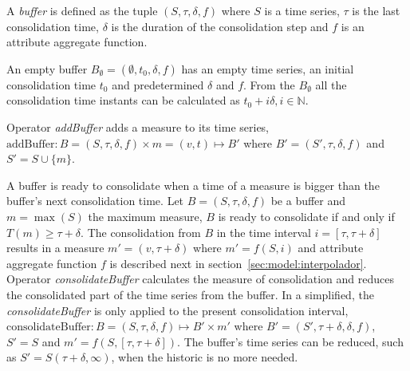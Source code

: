 \begin{definition}[Buffer]
  A \emph{buffer} is defined as the tuple $(S,\tau,\delta,f)$ where
  $S$ is a time series, $\tau$ is the last consolidation time, $\delta$
  is the duration of the consolidation step and $f$ is an
  attribute aggregate function. 

  An empty buffer $B_{\emptyset} = (\emptyset,t_0, \delta, f)$ has an
  empty time series, an initial consolidation time $t_0$ and
  predetermined $\delta$ and $f$. From the $B_{\emptyset}$ all the
  consolidation time instants can be calculated as $t_0+i\delta,
  i\in\mathbb{N}$.
\end{definition}


Operator \emph{addBuffer} adds a 
measure to its time series, $\text{addBuffer}: B =
(S,\tau,\delta,f) \times m = (v,t) \mapsto B'$ where
$B'=(S',\tau,\delta,f)$ and $S' = S \cup \{m\} $.



A buffer is ready to consolidate when a time of a measure is
bigger than the buffer's next consolidation time.  Let
$B=(S,\tau,\delta,f)$ be a buffer and $m=\max(S)$ the maximum measure,
$B$ is ready to consolidate if and only if $T(m) \geq \tau+\delta$.
The consolidation from $B$ in the time interval $i=[\tau,\tau+\delta]$
results in a measure $m'=(v,\tau+\delta)$ where $m'=f(S,i)$ and attribute
aggregate function $f$ is described next in
section~\ref{sec:model:interpolador}.  Operator
\emph{consolidateBuffer} calculates the measure of consolidation and
reduces the consolidated part of the time series from the buffer. In a
simplified, the \emph{consolidateBuffer} is only applied to the
present consolidation interval, $\text{consolidateBuffer}:
B=(S,\tau,\delta,f) \mapsto B' \times m' $ where $ B'=
(S',\tau+\delta,\delta,f)$, $ S' = S$ and $m' =
f(S,[\tau,\tau+\delta])$. The buffer's time series
can be reduced, such as $ S' = S(\tau+\delta,\infty)$, when the
historic is no more needed.








